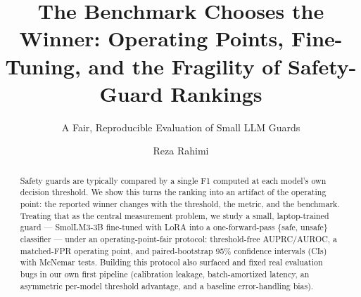 \documentclass[sigconf,nonacm]{acmart}
\begin{document}
\title{The Benchmark Chooses the Winner: Operating Points, Fine-Tuning, and the Fragility of Safety-Guard Rankings}
\subtitle{A Fair, Reproducible Evaluation of Small LLM Guards}

\author{Reza Rahimi}

\begin{abstract}
Safety guards are typically compared by a single F1 computed at each model's own decision threshold. We show this turns the ranking into an artifact of the operating point: the reported winner changes with the threshold, the metric, and the benchmark. Treating that as the central measurement problem, we study a small, laptop-trained guard --- SmolLM3-3B fine-tuned with LoRA into a one-forward-pass \{safe, unsafe\} classifier --- under an operating-point-fair protocol: threshold-free AUPRC/AUROC, a matched-FPR operating point, and paired-bootstrap 95\% confidence intervals (CIs) with McNemar tests. Building this protocol also surfaced and fixed real evaluation bugs in our own first pipeline (calibration leakage, batch-amortized latency, an asymmetric per-model threshold advantage, and a baseline error-handling bias).


\end{abstract}
\end{document}
